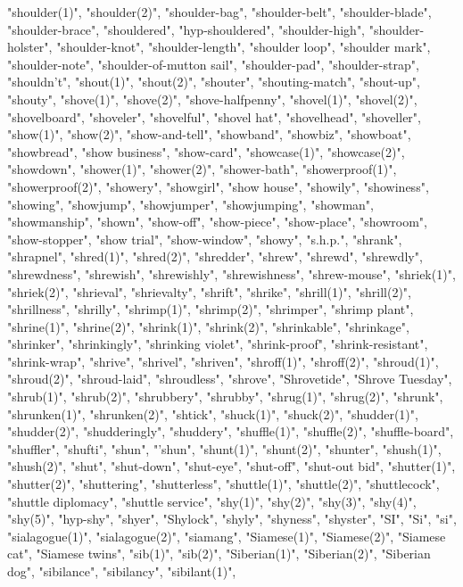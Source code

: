 "shoulder(1)",
"shoulder(2)",
"shoulder-bag",
"shoulder-belt",
"shoulder-blade",
"shoulder-brace",
"shouldered",
"hyp-shouldered",
"shoulder-high",
"shoulder-holster",
"shoulder-knot",
"shoulder-length",
"shoulder loop",
"shoulder mark",
"shoulder-note",
"shoulder-of-mutton sail",
"shoulder-pad",
"shoulder-strap",
"shouldn't",
"shout(1)",
"shout(2)",
"shouter",
"shouting-match",
"shout-up",
"shouty",
"shove(1)",
"shove(2)",
"shove-halfpenny",
"shovel(1)",
"shovel(2)",
"shovelboard",
"shoveler",
"shovelful",
"shovel hat",
"shovelhead",
"shoveller",
"show(1)",
"show(2)",
"show-and-tell",
"showband",
"showbiz",
"showboat",
"showbread",
"show business",
"show-card",
"showcase(1)",
"showcase(2)",
"showdown",
"shower(1)",
"shower(2)",
"shower-bath",
"showerproof(1)",
"showerproof(2)",
"showery",
"showgirl",
"show house",
"showily",
"showiness",
"showing",
"showjump",
"showjumper",
"showjumping",
"showman",
"showmanship",
"shown",
"show-off",
"show-piece",
"show-place",
"showroom",
"show-stopper",
"show trial",
"show-window",
"showy",
"s.h.p.",
"shrank",
"shrapnel",
"shred(1)",
"shred(2)",
"shredder",
"shrew",
"shrewd",
"shrewdly",
"shrewdness",
"shrewish",
"shrewishly",
"shrewishness",
"shrew-mouse",
"shriek(1)",
"shriek(2)",
"shrieval",
"shrievalty",
"shrift",
"shrike",
"shrill(1)",
"shrill(2)",
"shrillness",
"shrilly",
"shrimp(1)",
"shrimp(2)",
"shrimper",
"shrimp plant",
"shrine(1)",
"shrine(2)",
"shrink(1)",
"shrink(2)",
"shrinkable",
"shrinkage",
"shrinker",
"shrinkingly",
"shrinking violet",
"shrink-proof",
"shrink-resistant",
"shrink-wrap",
"shrive",
"shrivel",
"shriven",
"shroff(1)",
"shroff(2)",
"shroud(1)",
"shroud(2)",
"shroud-laid",
"shroudless",
"shrove",
"Shrovetide",
"Shrove Tuesday",
"shrub(1)",
"shrub(2)",
"shrubbery",
"shrubby",
"shrug(1)",
"shrug(2)",
"shrunk",
"shrunken(1)",
"shrunken(2)",
"shtick",
"shuck(1)",
"shuck(2)",
"shudder(1)",
"shudder(2)",
"shudderingly",
"shuddery",
"shuffle(1)",
"shuffle(2)",
"shuffle-board",
"shuffler",
"shufti",
"shun",
"'shun",
"shunt(1)",
"shunt(2)",
"shunter",
"shush(1)",
"shush(2)",
"shut",
"shut-down",
"shut-eye",
"shut-off",
"shut-out bid",
"shutter(1)",
"shutter(2)",
"shuttering",
"shutterless",
"shuttle(1)",
"shuttle(2)",
"shuttlecock",
"shuttle diplomacy",
"shuttle service",
"shy(1)",
"shy(2)",
"shy(3)",
"shy(4)",
"shy(5)",
"hyp-shy",
"shyer",
"Shylock",
"shyly",
"shyness",
"shyster",
"SI",
"Si",
"si",
"sialagogue(1)",
"sialagogue(2)",
"siamang",
"Siamese(1)",
"Siamese(2)",
"Siamese cat",
"Siamese twins",
"sib(1)",
"sib(2)",
"Siberian(1)",
"Siberian(2)",
"Siberian dog",
"sibilance",
"sibilancy",
"sibilant(1)",
